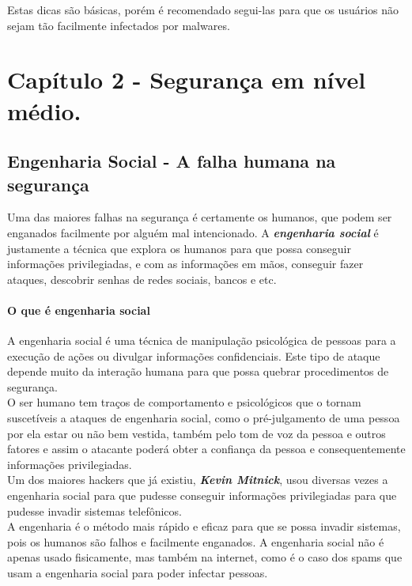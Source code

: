 \documentclass[12pt, letterpaper, Monospace:12]{report}
\begin{document}
	Estas dicas são básicas, porém é recomendado segui-las para que os usuários não sejam tão facilmente infectados por malwares.\\

\pagebreak

\part{Capítulo 2 - Segurança em nível médio.}

\chapter{Engenharia Social - A falha humana na segurança}
	Uma das maiores falhas na segurança é certamente os humanos, que podem ser enganados facilmente por alguém mal intencionado. A \textbf{\textit{engenharia social}} é justamente a técnica que explora os humanos para que possa conseguir informações privilegiadas, e com as informações em mãos, conseguir fazer ataques, descobrir senhas de redes sociais, bancos e etc.\\

\subsection{O que é engenharia social}
	A engenharia social é uma técnica de manipulação psicológica de pessoas para a execução de ações ou divulgar informações confidenciais. Este tipo de ataque depende muito da interação humana para que possa quebrar procedimentos de segurança.\\
	O ser humano tem traços de comportamento e psicológicos que o tornam suscetíveis a ataques de engenharia social, como o pré-julgamento de uma pessoa por ela estar ou não bem vestida, também pelo tom de voz da pessoa e outros fatores e assim o atacante poderá obter a confiança da pessoa e consequentemente informações privilegiadas.\\

	Um dos maiores hackers que já existiu, \textbf{\textit{Kevin Mitnick}}, usou diversas vezes a engenharia social para que pudesse conseguir informações privilegiadas para que pudesse invadir sistemas telefônicos.\\

	A engenharia é o método mais rápido e eficaz para que se possa invadir sistemas, pois os humanos são falhos e facilmente enganados. A engenharia social não é apenas usado fisicamente, mas também na internet, como é o caso dos spams que usam a engenharia social para poder infectar pessoas.\\
\end{document}
